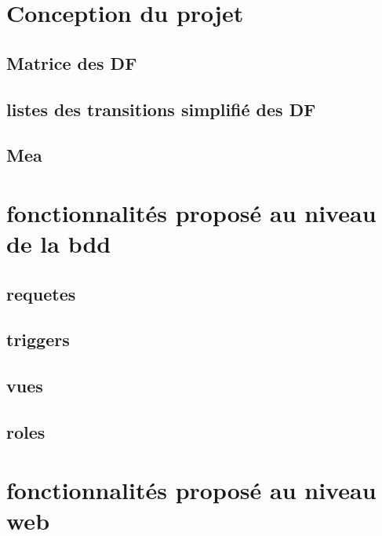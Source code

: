 \documentclass{report}
\begin{document}
\chapter{Conception du projet}
\section{Matrice des DF}
\section{listes des transitions simplifié des DF}
\section{Mea}
\chapter{fonctionnalités proposé au niveau de la bdd}
\section{requetes}
\section{triggers}
\section{vues}
\section{roles}
\chapter{fonctionnalités proposé au niveau web}
\end{document}
